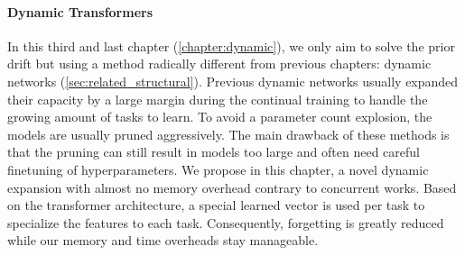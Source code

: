 \paragraph{Dynamic Transformers} In this third and last chapter (\autoref{chapter:dynamic}), we only
aim to solve the prior drift but using a method radically different from previous chapters: dynamic
networks (\autoref{sec:related_structural}). Previous dynamic networks usually expanded their
capacity by a large margin during the continual training to handle the growing amount of tasks to
learn. To avoid a parameter count explosion, the models are usually pruned aggressively. The main
drawback of these methods is that the pruning can still result in models too large and often need
careful finetuning of hyperparameters. We propose in this chapter, a novel dynamic expansion with
almost no memory overhead contrary to concurrent works. Based on the transformer architecture, a
special learned vector is used per task to specialize the features to each task. Consequently,
forgetting is greatly reduced while our memory and time overheads stay manageable.
